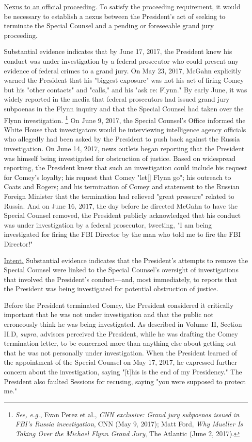 {\underline{Nexus to an official proceeding.}
To satisfy the proceeding requirement, it would be necessary to establish a nexus between the President's act of seeking to terminate the Special Counsel and a pending or foreseeable grand jury proceeding.

Substantial evidence indicates that by June 17, 2017, the President knew his conduct was under investigation by a federal prosecutor who could present any evidence of federal crimes to a grand jury.
On May 23, 2017, McGahn explicitly warned the President that his "biggest exposure" was not his act of firing Comey but his "other contacts" and "calls," and his "ask re: Flynn."
By early June, it was widely reported in the media that federal prosecutors had issued grand jury subpoenas in the Flynn inquiry and that the Special Counsel had taken over the Flynn investigation.%
\footnote{\textit{See, e.g.}, Evan Perez et al., \textit{CNN exclusive: Grand jury subpoenas issued in FBI's Russia investigation}, CNN (May 9, 2017);
Matt Ford, \textit{Why Mueller Is Taking Over the Michael Flynn Grand Jury}, The Atlantic (June 2, 2017).}
On June 9, 2017, the Special Counsel's Office informed the White House that investigators would be interviewing intelligence agency officials who allegedly had been asked by the President to push back against the Russia investigation.
On June 14, 2017, news outlets began reporting that the President was himself being investigated for obstruction of justice.
Based on widespread reporting, the President knew that such an investigation could include his request for Comey's loyalty;
his request that Comey "let[] Flynn go";
his outreach to Coats and Rogers;
and his termination of Comey and statement to the Russian Foreign Minister that the termination had relieved "great pressure" related to Russia.
And on June 16, 2017, the day before he directed McGahn to have the Special Counsel removed, the President publicly acknowledged that his conduct was under investigation by a federal prosecutor, tweeting, "I am being investigated for firing the FBI Director by the man who told me to fire the FBI Director!"

\underline{Intent.}
Substantial evidence indicates that the President's attempts to remove the Special Counsel were linked to the Special Counsel's oversight of investigations that involved the President's conduct---and, most immediately, to reports that the President was being investigated for potential obstruction of justice.

Before the President terminated Comey, the President considered it critically important that he was not under investigation and that the public not erroneously think he was being investigated.
As described in Volume~II, Section II.D, \textit{supra}, advisors perceived the President, while he was drafting the Comey termination letter, to be concerned more than anything else about getting out that he was not personally under investigation.
When the President learned of the appointment of the Special Counsel on May 17, 2017, he expressed further concern about the investigation, saying "[t]his is the end of my Presidency."
The President also faulted Sessions for recusing, saying "you were supposed to protect me."

}
